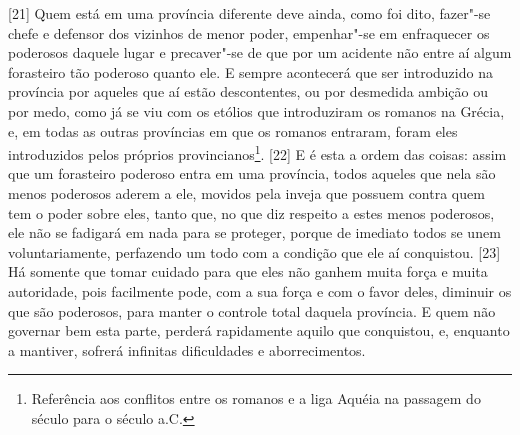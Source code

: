 {[}21{]} Quem está em uma província diferente deve ainda, como foi dito,
fazer"-se chefe e defensor dos vizinhos de menor poder, empenhar"-se em
enfraquecer os poderosos daquele lugar e precaver"-se de que por um
acidente não entre aí algum forasteiro tão poderoso quanto ele. E sempre
acontecerá que ser introduzido na província por aqueles que aí estão
descontentes, ou por desmedida ambição ou por medo, como já se viu com
os etólios que introduziram os romanos na Grécia, e, em todas as outras
províncias em que os romanos entraram, foram eles introduzidos pelos
próprios provincianos\footnote{Referência aos conflitos entre os romanos
  e a liga Aquéia na passagem do século  para o século  a.C.}.
{[}22{]} E é esta a ordem das coisas: assim que um forasteiro poderoso
entra em uma província, todos aqueles que nela são menos poderosos
aderem a ele, movidos pela inveja que possuem contra quem tem o poder
sobre eles, tanto que, no que diz respeito a estes menos poderosos, ele
não se fadigará em nada para se proteger, porque de imediato todos se
unem voluntariamente, perfazendo um todo com a condição que ele aí
conquistou. {[}23{]} Há somente que tomar cuidado para que eles não
ganhem muita força e muita autoridade, pois facilmente pode, com a sua
força e com o favor deles, diminuir os que são poderosos, para manter o
controle total daquela província. E quem não governar bem esta parte,
perderá rapidamente aquilo que conquistou, e, enquanto a mantiver,
sofrerá infinitas dificuldades e aborrecimentos.

